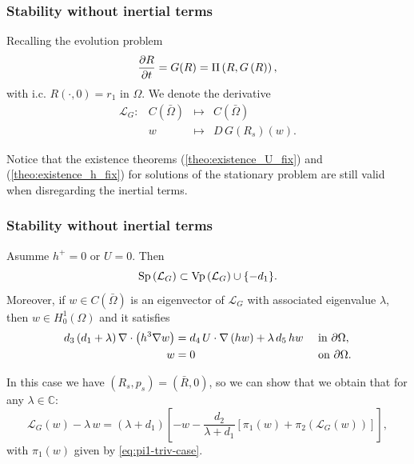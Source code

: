\documentclass[10pt,aspectratio=169]{beamer}
\newenvironment{nalign}{
	\begin{equation}
	\begin{aligned}
}{
	\end{aligned}
	\end{equation}
	\ignorespacesafterend
}
\newcommand{\hzero}{H^1_0\left(\Omega\right)}
\newcommand{\cont}{C\left(\bar{\Omega}\right)}
\newcommand{\Sp}[1]{\textnormal{Sp}\left(#1\right)}
\newcommand{\Vp}[1]{\textnormal{Vp}\left(#1\right)}
\begin{document}

\begin{frame}\frametitle{Stability without inertial terms}
Recalling the evolution problem
\begin{equation}
\frac{\partial R}{\partial t}=G(R)=\Pi\left(R,G\left(R\right)\right),
\end{equation}
with i.c. $R\left(\cdot,0\right)=r_1$ in $\Omega$. We denote the derivative
\begin{equation}
\begin{array}{cccl}
\mathcal{L}_G:&\cont&\longmapsto& \cont\\
&w& \longmapsto & D\,G\left(R_s\right)\left(w\right).\label{eq:def-L_G}
\end{array}
\end{equation} 
\bigskip

Notice that the existence theorems (\ref{theo:existence_U_fix}) and (\ref{theo:existence_h_fix}) for solutions of the stationary problem are still valid when disregarding the inertial terms.
\end{frame}


\begin{frame}\frametitle{Stability without inertial terms}
\begin{lemma}\label{lemma:spec-L_G}
Asumme $h^+=0$ or $U=0$. Then 
$$\Sp{\mathcal{L}_G}\subset\Vp{\mathcal{L}_G}\cup\{-d_1\}.$$
Moreover, if $w\in\cont$ is an eigenvector of $\mathcal{L}_G$ with associated eigenvalue $\lambda$, then $w\in\hzero$ and it satisfies 
\begin{nalign}
	\begin{split}
		d_3\left(d_1+\lambda\right)\nabla\cdot \left(h^3\nabla w\right)&=d_4\,U\cdot \nabla \left(hw\right)+\lambda \,d_5\,hw&&\textnormal{ in } \partial \Omega,\\
		w&=0 &&\textnormal{ on } \partial \Omega.
	\end{split}
	\label{eq:eigenvectors-L_G}
\end{nalign}
\end{lemma}
In this case we have $\left(R_s,p_s\right)=\left(\bar{R},0\right)$, so we can show that
we obtain that for any $\lambda\in\mathbb{C}$:
\begin{equation}
\mathcal{L}_G\left(w\right)-\lambda\, w=\left(\lambda+d_1\right)\left[-w-\frac{d_2}{\lambda+d_1}\left[\pi_1\left(w\right)+\pi_2\left(\mathcal{L}_G\left(w\right)\right)\right]\right],\label{eq:L_G2}
\end{equation}
with $\pi_1\left(w\right)$ given by \eqref{eq:pi1-triv-case}.
\end{frame}
\end{document}
